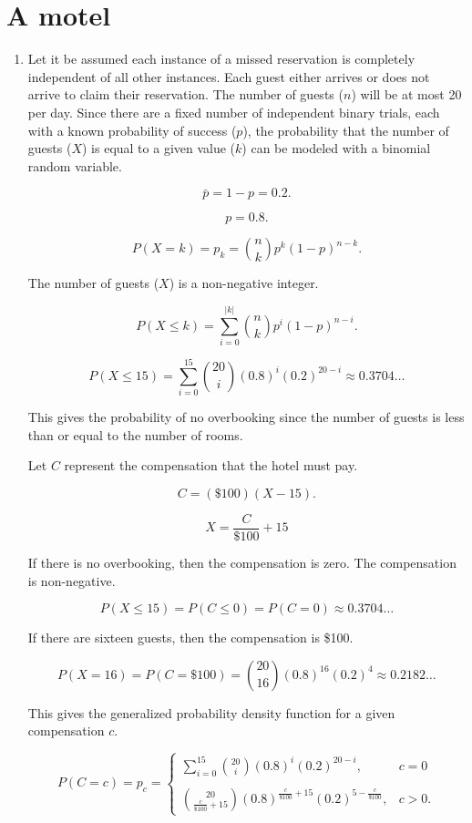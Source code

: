 \documentclass[12pt]{article}
\begin{document}
\section{A motel}
\begin{enumerate}
\item
Let it be assumed each instance of a missed reservation is completely independent of all other instances. Each guest either arrives or does not arrive to claim their reservation. The number of guests ($n$) will be at most 20 per day. Since there are a fixed number of independent binary trials, each with a known probability of success ($p$), the probability that the number of guests ($X$) is equal to a given value ($k$) can be modeled with a binomial random variable. 

\[\bar{p}=1-p=0.2.\]

\[p=0.8.\]

\[P(X=k)=p_k={\binom{n}{k}}p^k(1-p)^{n-k}.\]

The number of guests ($X$) is a non-negative integer.

\[P(X\leq k)=\sum^{|k|}_{i=0}{\binom{n}{k}p^i(1-p)^{n-i}}.\]

\[P(X\leq 15)=\sum^{15}_{i=0}{\binom{20}{i}(0.8)^i(0.2)^{20-i}\approx 0.3704}\dots\]

This gives the probability of no overbooking since the number of guests is less than or equal to the number of rooms.

Let $C$ represent the compensation that the hotel must pay.

\[C=(\$100)(X-15).\]

\[X=\frac{C}{\$100}+15\]

If there is no overbooking, then the compensation is zero. The compensation is non-negative. 

\[P(X\leq 15)=P(C\leq 0)=P(C=0)\approx 0.3704\dots\]

If there are sixteen guests, then the compensation is \$100.

\[P(X=16)=P(C=\$100)=\binom{20}{16}(0.8)^{16}(0.2)^4\approx 0.2182\dots\]

This gives the generalized probability density function for a given compensation $c$.

\begin{equation}
P(C=c)=p_c=\begin{cases}
    \sum^{15}_{i=0}{\binom{20}{i}(0.8)^i(0.2)^{20-i}},&c=0\\\\
    \binom{20}{\frac{c}{\$100}+15}(0.8)^{\frac{c}{\$100}+15}(0.2)^{5-\frac{c}{\$100}},&c>0.
\end{cases}
\end{equation}


\end{enumerate}
\end{document}
